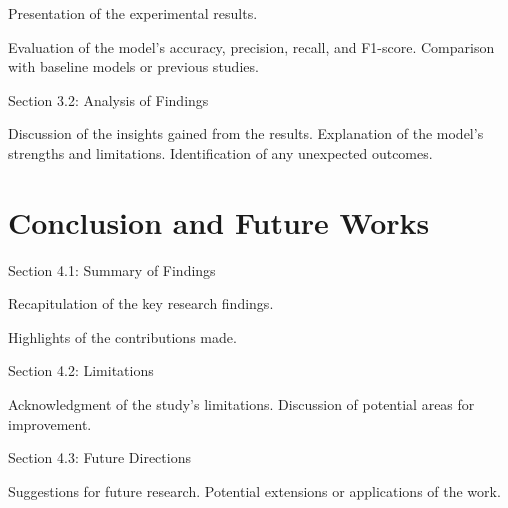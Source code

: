 \documentclass[12pt]{book} %
\begin{document}
    Presentation of the experimental results.

    Evaluation of the model's accuracy, precision, recall, and F1-score.
    Comparison with baseline models or previous studies.

Section 3.2: Analysis of Findings

    Discussion of the insights gained from the results.
    Explanation of the model's strengths and limitations.
    Identification of any unexpected outcomes.


\chapter{Conclusion and Future Works}
Section 4.1: Summary of Findings

    Recapitulation of the key research findings.

    Highlights of the contributions made.

Section 4.2: Limitations

    Acknowledgment of the study's limitations.
    Discussion of potential areas for improvement.

Section 4.3: Future Directions

    Suggestions for future research.
    Potential extensions or applications of the work.
\end{document}
